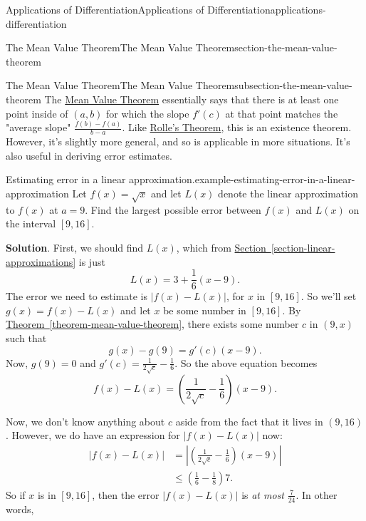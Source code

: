 \documentclass[oneside,10pt,]{book}
\numberwithin{equation}{section}
\begin{document}
\begin{chapterptx}{Applications of Differentiation}{}{Applications of Differentiation}{}{}{applications-differentiation}
\begin{sectionptx}{The Mean Value Theorem}{}{The Mean Value Theorem}{}{}{section-the-mean-value-theorem}
\begin{subsectionptx}{The Mean Value Theorem}{}{The Mean Value Theorem}{}{}{subsection-the-mean-value-theorem}
The \hyperref[theorem-mean-value-theorem]{Mean Value Theorem} essentially says that there is at least one point inside of \((a,b)\) for which the slope \(f'(c)\) at that point matches the "average slope" \(\frac{f(b) - f(a)}{b-a}.\) Like \hyperref[theorem-rolle-s-theorem]{Rolle's Theorem}, this is an existence theorem. However, it's slightly more general, and so is applicable in more situations. It's also useful in deriving error estimates.%
\begin{example}{Estimating error in a linear approximation.}{example-estimating-error-in-a-linear-approximation}%
\hypertarget{p-340}{}%
Let \(f(x) = \sqrt{x}\) and let \(L(x)\) denote the linear approximation to \(f(x)\) at \(a=9\). Find the largest possible error between \(f(x)\) and \(L(x)\) on the interval \([9,16]\).%
\par\smallskip%
\noindent\textbf{Solution}.\hypertarget{solution-74}{}\quad%
\hypertarget{p-341}{}%
First, we should find \(L(x)\), which from \hyperref[section-linear-approximations]{Section~\ref{section-linear-approximations}} is just%
\begin{equation*}
L(x) = 3 + \frac{1}{6}(x-9).
\end{equation*}
The error we need to estimate is \(|f(x) - L(x)|\), for \(x\) in \([9,16]\). So we'll set \(g(x) = f(x) - L(x)\) and let \(x\) be some number in \([9,16]\). By \hyperref[theorem-mean-value-theorem]{Theorem~\ref{theorem-mean-value-theorem}}, there exists some number \(c\) in \((9,x)\) such that%
\begin{equation*}
g(x) - g(9) = g'(c)(x-9).
\end{equation*}
Now, \(g(9) = 0\) and \(g'(c) = \frac{1}{2\sqrt{c}} - \frac{1}{6}\). So the above equation becomes%
\begin{equation*}
f(x) - L(x) = \left(\frac{1}{2\sqrt{c}} - \frac{1}{6}\right)(x-9).
\end{equation*}
%
\par
\hypertarget{p-342}{}%
Now, we don't know anything about \(c\) aside from the fact that it lives in \((9,16)\). However, we do have an expression for \(|f(x) - L(x)|\) now:%
\begin{align*}
|f(x) - L(x)| & = \left|\left(\frac{1}{2\sqrt{c}} - \frac{1}{6}\right)(x-9)\right|\\
& \leq \left(\frac{1}{6} - \frac{1}{8}\right)7. 
\end{align*}
So if \(x\) is in \([9,16]\), then the error \(|f(x) - L(x)|\) is \emph{at most} \(\frac{7}{24}\). In other words,%
\begin{equation*}

\end{equation*}
\end{example}
\end{subsectionptx}
\end{sectionptx}
\end{chapterptx}
\end{document}
